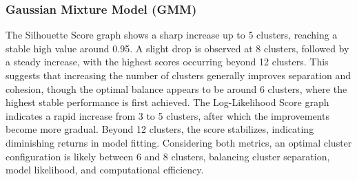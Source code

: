         \subsubsection{Gaussian Mixture Model (GMM) \\}

            The Silhouette Score graph shows a sharp increase up to 5 clusters, reaching a stable high value around 0.95. A slight drop is observed at 8 clusters, followed by a steady increase, with the highest scores occurring beyond 12 clusters. This suggests that increasing the number of clusters generally improves separation and cohesion, though the optimal balance appears to be around 6 clusters, where the highest stable performance is first achieved. The Log-Likelihood Score graph indicates a rapid increase from 3 to 5 clusters, after which the improvements become more gradual. Beyond 12 clusters, the score stabilizes, indicating diminishing returns in model fitting. Considering both metrics, an optimal cluster configuration is likely between 6 and 8 clusters, balancing cluster separation, model likelihood, and computational efficiency.

        
